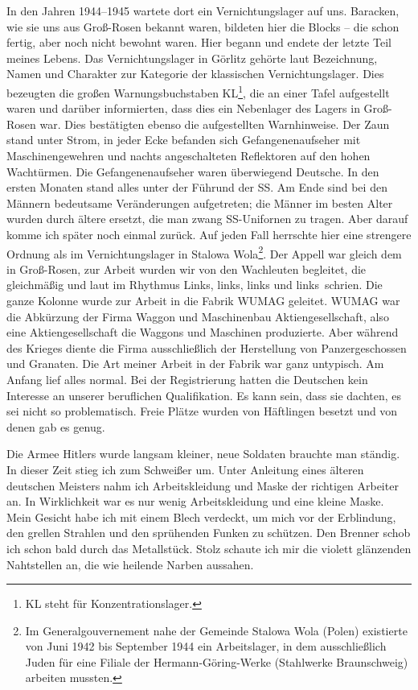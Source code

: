 In den Jahren 1944--1945 wartete dort ein Vernichtungslager auf uns. 
Baracken, wie sie uns aus Groß-Rosen bekannt waren, bildeten hier die Blocks -- die schon fertig, aber noch nicht bewohnt waren. Hier begann und endete der letzte Teil meines Lebens. Das Vernichtungslager in Görlitz gehörte laut Bezeichnung, Namen und Charakter zur Kategorie der klassischen Vernichtungslager. Dies bezeugten die großen Warnungsbuchstaben KL\footnote{KL steht für Konzentrationslager.}, die an einer Tafel aufgestellt waren und darüber informierten, dass dies ein Nebenlager des Lagers in Groß-Rosen war. Dies bestätigten ebenso die aufgestellten Warnhinweise. Der Zaun stand unter Strom, in jeder Ecke befanden sich Gefangenenaufseher mit Maschinengewehren und nachts angeschalteten Reflektoren auf den hohen Wachtürmen. Die Gefangenenaufseher waren überwiegend Deutsche. In den ersten Monaten stand alles unter der Führund der SS. Am Ende sind bei den Männern bedeutsame Veränderungen aufgetreten; die Männer im besten Alter wurden durch ältere ersetzt, die man zwang SS-Unifornen zu tragen. Aber darauf komme ich später noch einmal zurück. Auf jeden Fall herrschte hier eine strengere Ordnung als im Vernichtungslager in Stalowa Wola\footnote{Im Generalgouvernement nahe der Gemeinde Stalowa Wola (Polen) existierte von Juni 1942 bis September 1944 ein Arbeitslager, in dem ausschließlich Juden für eine Filiale der Hermann-Göring-Werke (Stahlwerke Braunschweig) arbeiten mussten.}. Der Appell war gleich dem in Groß-Rosen, zur Arbeit wurden wir von den Wachleuten begleitet, die gleichmäßig und laut im Rhythmus \glqq Links, links, links und links\grqq~schrien.
Die ganze Kolonne wurde zur Arbeit in die Fabrik WUMAG geleitet. WUMAG war die Abkürzung der Firma \glqq Waggon und Maschinenbau Aktiengesellschaft\grqq, also eine Aktiengesellschaft die Waggons und Maschinen produzierte. Aber während des Krieges diente die Firma ausschließlich der Herstellung von Panzergeschossen und Granaten. Die Art meiner Arbeit in der Fabrik war ganz untypisch. Am Anfang lief alles normal. Bei der Registrierung hatten die Deutschen kein Interesse an unserer beruflichen Qualifikation. Es kann sein, dass sie dachten, es sei nicht so problematisch. Freie Plätze wurden von Häftlingen besetzt und von denen gab es genug.

Die Armee Hitlers wurde langsam kleiner, neue Soldaten brauchte man ständig. 
In dieser Zeit stieg ich zum Schweißer um. Unter Anleitung eines älteren deutschen Meisters nahm ich Arbeitskleidung und Maske der richtigen Arbeiter an. In Wirklichkeit war es nur wenig Arbeitskleidung und eine kleine Maske. Mein Gesicht habe ich mit einem Blech verdeckt, um mich vor der Erblindung, den grellen Strahlen und den sprühenden Funken zu schützen. Den Brenner schob ich schon bald durch das Metallstück. Stolz schaute ich mir die violett glänzenden Nahtstellen an, die wie heilende Narben aussahen.

